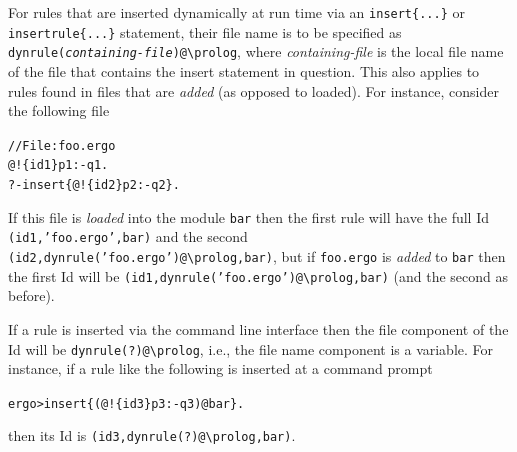 \documentclass[11pt]{article}
\newcommand{\ERGO}{\mbox{\smaller{\ensuremath{\cal{E}}\smaller{{\sc{RGO}}}}}\xspace}
\newcommand{\FLSYSTEM}{\ERGO}
\newcommand{\prompt}{ergo> }
\newcommand{\ergoext}{ergo\xspace}
\newcommand{\bs}{\textbackslash}
\begin{document}
For rules that are inserted dynamically at run time
via an \texttt{insert\{...\}} or
\texttt{insertrule\{...\}}  statement, their file name is to be specified
as \texttt{dynrule(\textnormal{\emph{containing-file}})@\bs{}prolog},
where \emph{containing-file} is the local file name of the
file that contains the insert statement in question.  This also applies to
rules found in files that are \emph{added} (as opposed to loaded). 
For instance, consider the following file
\begin{alltt}
   // File: foo.\ergoext
   @!\{id1\} p1 :- q1.
   ?- insert\{@!\{id2\} p2 :- q2\}.
\end{alltt}
If this file is \emph{loaded} into the module \texttt{bar} then the first
rule will have the full Id \texttt{(id1,'foo.\ergoext',bar)} and the second
\texttt{(id2,dynrule('foo.\ergoext')@\bs{}prolog,bar)}, but if
\texttt{foo.\ergoext} is \emph{added} to \texttt{bar} then the first Id will be
\texttt{(id1,dynrule('foo.\ergoext')@\bs{}prolog,bar)} (and the second as
before).

If a rule is inserted via the \FLSYSTEM command line interface then the
file component of the Id will be \texttt{dynrule(?)@\bs{}prolog}, i.e., the
file name component is a variable. For instance, if a rule like the
following is inserted at a command prompt
\begin{alltt}
   \prompt  insert\{(@!\{id3\} p3 :- q3)@bar\}.
\end{alltt}
then its Id is \texttt{(id3,dynrule(?)@\bs{}prolog,bar)}.
\end{document}
